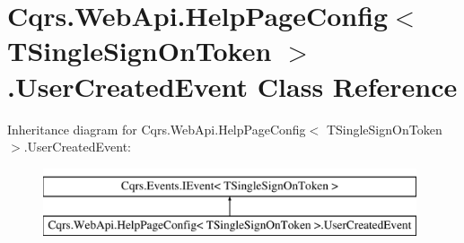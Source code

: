 \hypertarget{classCqrs_1_1WebApi_1_1HelpPageConfig_1_1UserCreatedEvent}{}\section{Cqrs.\+Web\+Api.\+Help\+Page\+Config$<$ T\+Single\+Sign\+On\+Token $>$.User\+Created\+Event Class Reference}
\label{classCqrs_1_1WebApi_1_1HelpPageConfig_1_1UserCreatedEvent}
Inheritance diagram for Cqrs.\+Web\+Api.\+Help\+Page\+Config$<$ T\+Single\+Sign\+On\+Token $>$.User\+Created\+Event\+:\begin{figure}[H]
\begin{center}
\leavevmode
\includegraphics[height=2.000000cm]{classCqrs_1_1WebApi_1_1HelpPageConfig_1_1UserCreatedEvent}
\end{center}
\end{figure}
